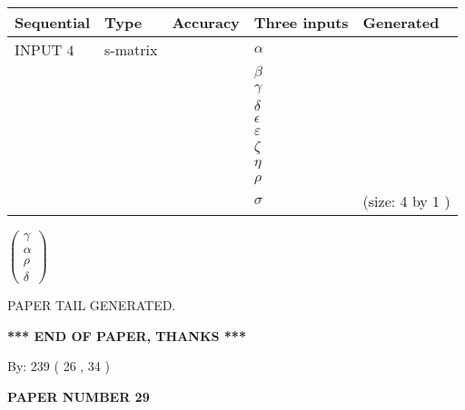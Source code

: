 \documentclass[12pt]{article}
\begin{document}
  
\noindent\begin{tabular}{|l|l|l|l|l|}
\hline
 Sequential & Type & Accuracy & Three inputs & Generated \\ 
\hline
 
 
  INPUT $            4 $ & s-matrix & & 
 $  \alpha $ & 
  \\
  & & & 
 $  \beta $ & 
  \\
  & & & 
 $  \gamma $ & 
  \\
  & & & 
 $  \delta $ & 
  \\
  & & & 
 $  \epsilon $ & 
  \\
  & & & 
 $  \varepsilon $ & 
  \\
  & & & 
 $                     \zeta $ & 
  \\
  & & & 
 $  \eta $ & 
  \\
  & & & 
 $  \rho $ & 
  \\
  & & & 
 $  \sigma $ & 
  (size:            4  by            1 )
 \\  \hline  
 \end{tabular}
   
   
 $  \left( \begin{array}
 {
 c
 }
 \gamma \\ 
 \alpha \\ 
 \rho \\ 
 \delta
 \end{array} \right) $ 
   
   
   
   
 \vspace{0.2in}
 
   
   
\vspace{2.0in} PAPER TAIL GENERATED.
   
   
   
   
\vspace{1.0in} 
{\textbf{\large{ *** END OF PAPER, THANKS *** }}} 
   
   
\hspace{1.0in} By: 
         239 (          26 ,           34 )
   
   
   
   
\newpage 
\setcounter{page}{ 
    29001 } 
   
   
   
   
 {\textbf{ \Large{ PAPER NUMBER           29  }}}
   
   
\vspace{0.2in}
   
\end{document}
